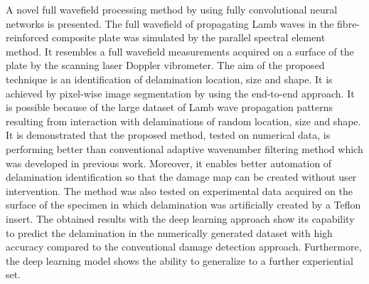 A novel full wavefield processing method by using fully convolutional neural networks is presented.
The full wavefield of propagating Lamb waves in the fibre-reinforced composite plate was simulated by the parallel spectral element method.
It resembles a full wavefield measurements acquired on a surface of the plate by the scanning laser Doppler vibrometer.
The aim of the proposed technique is an identification of delamination location, size and shape.
It is achieved by pixel-wise image segmentation by using the end-to-end approach.
It is possible because of the large dataset of Lamb wave propagation patterns resulting from interaction with delaminations of random location, size and shape.
It is demonstrated that the proposed method, tested on numerical data, is performing better than conventional adaptive wavenumber filtering method which was developed in previous work.
Moreover, it enables better automation of delamination identification so that the damage map can be created without user intervention.
The method was also tested on experimental data acquired on the surface of the specimen in which delamination was artificially created by a Teflon insert.
The obtained results with the deep learning approach show its capability to predict the delamination in the numerically generated dataset with high accuracy compared to the conventional damage detection approach. Furthermore, the deep learning model shows the ability to generalize to a further experiential set.